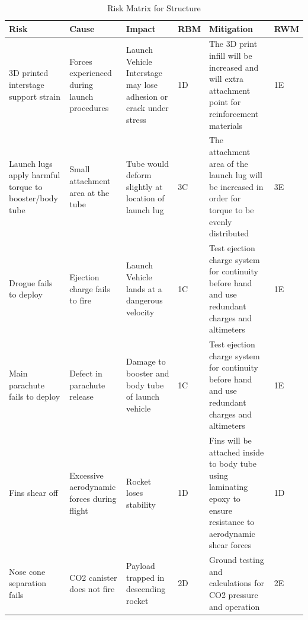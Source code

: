    \begin{table}[]
    \label{vertical unfolding arms}
    {\footnotesize
    \caption{Risk Matrix for Structure}
    \centering
    \begin{tabularx}{\linewidth}{XXXlXl}
    \toprule
    \textbf{Risk}                                            & \textbf{Cause}                                                                                                                 & \textbf{Impact}                                                                                                                           & \textbf{RBM}  & \textbf{Mitigation}                                                                                                                                                                                     & \textbf{RWM} \\ \midrule
    3D printed interstage support strain & Forces experienced during launch procedures & Launch Vehicle Interstage may lose adhesion or crack under stress & \cellcolor{orange!25} 1D & The 3D print infill will be increased and will extra attachment point for reinforcement materials & \cellcolor{green!25} 1E \\
    Launch lugs apply harmful torque to booster/body tube & Small attachment area at the tube & Tube would deform slightly at location of launch lug & \cellcolor{orange!25} 3C & The attachment area of the launch lug will be increased in order for torque to be evenly distributed & \cellcolor{green!25} 3E \\
    Drogue fails to deploy & Ejection charge fails to fire & Launch Vehicle lands at a dangerous velocity & \cellcolor{red!25} 1C & Test ejection charge system for continuity before hand and use redundant charges and altimeters & \cellcolor{green!25} 1E \\
    Main parachute fails to deploy & Defect in parachute release & Damage to booster and body tube of launch vehicle & \cellcolor{red!25} 1C & Test ejection charge system for continuity before hand and use redundant charges and altimeters & \cellcolor{green!25} 1E \\ \midrule
    Fins shear off & Excessive aerodynamic forces during flight & Rocket loses stability & \cellcolor{orange!25} 1D & Fins will be attached inside to body tube using laminating epoxy to ensure resistance to aerodynamic shear forces & \cellcolor{orange!25} 1D \\
    Nose cone separation fails & CO2 canister does not fire & Payload trapped in descending rocket & \cellcolor{orange!25} 2D & Ground testing and calculations for CO2 pressure and operation & \cellcolor{green!25} 2E \\

\end{tabularx}}
\end{table}
